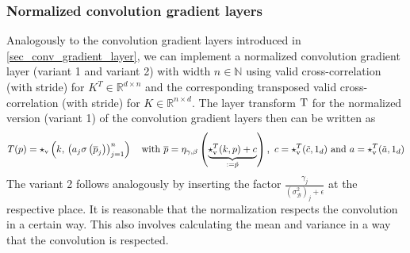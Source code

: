 \documentclass[twoside,a4paper]{article}
\begin{document}
\subsubsection{Normalized convolution gradient layers}\label{sec_norm_conv_gradient_layer}

Analogously to the convolution gradient layers introduced in \cref{sec_conv_gradient_layer},
we can implement a normalized convolution gradient layer (variant 1 and variant 2) 
with width $n \in \mathbb{N}$
using valid cross-correlation (with stride) for $K^T \in \mathbb{R}^{d \times n}$ and the
corresponding transposed valid cross-correlation (with stride) for $K \in \mathbb{R}^{n \times d}$.
The layer transform $\mathrm{T}$ for the normalized version (variant 1) of the convolution gradient
layers then can be written as
\begin{equation*}
	T(p) = \star_{\text{v}} \left( k, \, \left( a_j \sigma \left( \overline{p}_j \right) \right)_{j=1}^n \right) 
	\quad
	\text{with } \overline{p} = 
	\eta_{\gamma, \beta} \left( \underbrace{\star_{\text{v}}^T(k,p) + c}_{:= \tilde{p}} \right)
	\text{, }\, c = \star_{\text{v}}^T(\tilde{c},1_d) 
	\text{ and } a = \star_{\text{v}}^T(\tilde{a},1_d)
\end{equation*}
The variant 2 follows analogously by inserting the factor 
$\frac{\gamma_j}{(\sigma^2_\mathcal{B})_j + \epsilon}$ at the respective place.
It is reasonable that the normalization respects the convolution in a certain way.
This also involves calculating the mean and variance in a way that the convolution is respected.
\end{document}
